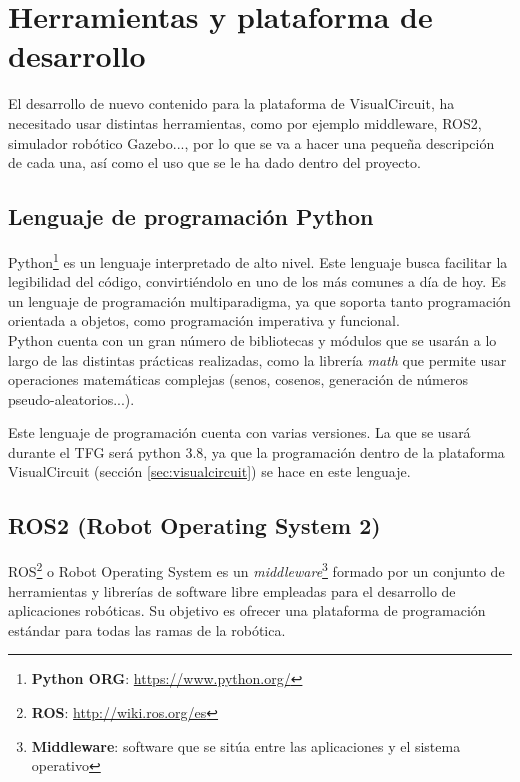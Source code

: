 \chapter{Herramientas y plataforma de desarrollo}
\label{cap:capitulo3}

El desarrollo de nuevo contenido para la plataforma de VisualCircuit, ha necesitado usar distintas herramientas, como por ejemplo middleware,
ROS2, simulador robótico Gazebo..., por lo que se va a hacer una pequeña descripción de cada una, así como el uso que se le ha dado dentro del proyecto.

\section{Lenguaje de programación Python}
\label{sec:lenguaje_programación_python}

Python\footnote{\textbf{Python ORG}: \url{https://www.python.org/}} es un lenguaje interpretado de alto nivel. Este lenguaje busca facilitar la legibilidad del código, convirtiéndolo en uno de los más comunes a día de hoy.
Es un lenguaje de programación multiparadigma, ya que soporta tanto programación orientada a objetos, como programación imperativa y funcional.\\

Python cuenta con un gran número de bibliotecas y módulos que se usarán a lo largo de las distintas prácticas realizadas, como la librería \textit{math} que
permite usar operaciones matemáticas complejas (senos, cosenos, generación de números pseudo-aleatorios...).

Este lenguaje de programación cuenta con varias versiones. La que se usará durante el TFG será python 3.8, ya que la programación dentro
de la plataforma VisualCircuit (sección \ref{sec:visualcircuit}) se hace en este lenguaje.

\section{ROS2 (Robot Operating System 2)}
\label{sec:ros2}

ROS\footnote{\textbf{ROS}: \url{http://wiki.ros.org/es}} o Robot Operating System es un
\textit{middleware}\footnote{{\textbf{Middleware}: software que se sitúa entre las aplicaciones y el sistema operativo}} formado
por un conjunto de herramientas y librerías de software libre empleadas para el desarrollo de aplicaciones robóticas.
Su objetivo es ofrecer una plataforma de programación estándar para todas las ramas de la robótica.\\

